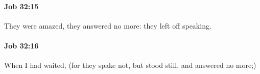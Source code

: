 		\paragraph{Job 32:15} %
			\label{JOB-32-15}

			They were amazed, they answered no more: they left off speaking.


		\paragraph{Job 32:16} %
			\label{JOB-32-16}

			When I had waited, (for they spake not, but stood still, and answered no more;)


